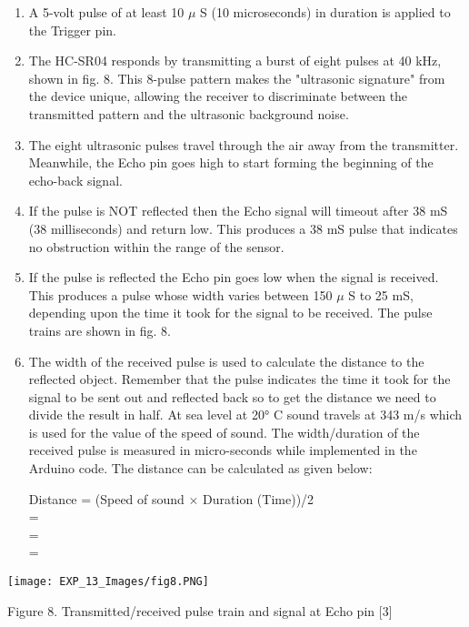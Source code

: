 \documentclass[12pt,a4paper]{article}
\begin{document}
\begin{justify}
\begin{enumerate}
\setlength\itemsep{-0.3em}
    \item A 5-volt pulse of at least 10 $\mu$ S (10 microseconds) in duration is applied to the Trigger pin. 
    \item  The HC-SR04 responds by transmitting a burst of eight pulses at 40 kHz, shown in fig. 8. This 8-pulse pattern makes the "ultrasonic signature" from the device unique, allowing the receiver to discriminate between the transmitted pattern and the ultrasonic background noise.
    \item  The eight ultrasonic pulses travel through the air away from the transmitter. Meanwhile, the Echo pin goes high to start forming the beginning of the echo-back signal.
    \item  If the pulse is NOT reflected then the Echo signal will timeout after 38 mS (38 milliseconds) and return low. This produces a 38 mS pulse that indicates no obstruction within the range of the sensor.
    \item  If the pulse is reflected the Echo pin goes low when the signal is received.  This produces a pulse whose width varies between 150 $\mu$ S to 25 mS, depending upon the time it took for the signal to be received. The pulse trains are shown in fig. 8.
    \item The width of the received pulse is used to calculate the distance to the reflected object. Remember that the pulse indicates the time it took for the signal to be sent out and reflected back so to get the distance we need to divide the result in half. At sea level at 20° C sound travels at 343 m/s which is used for the value of the speed of sound. The width/duration of the received pulse is measured in micro-seconds while implemented in the Arduino code. The distance can be calculated as given below:
    
    Distance = (Speed of sound $\times$ Duration (Time))/2  \\[3pt]
    
     =  \\[3pt]
     
     = \\[3pt]
     
     = 
\end{enumerate}
\vspace{2mm}
\begin{center} 
\texttt{[image: EXP\_13\_Images/fig8.PNG]}
\end{center}
\begin{center} {Figure 8. Transmitted/received pulse train and signal at Echo pin [3]}\end{center}


\end{justify}
\end{document}
